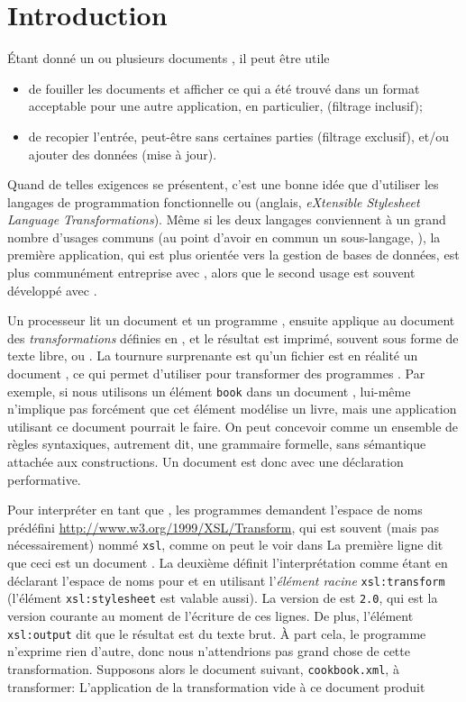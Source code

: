 \section{Introduction}

Étant donné un ou plusieurs documents \XML, il peut être utile
\begin{itemize}

  \item de fouiller les documents et afficher ce qui a été trouvé dans
  un format acceptable pour une autre application, en
  particulier, \XML (filtrage inclusif);

  \item de recopier l'entrée, peut-être sans certaines parties
    (filtrage exclusif), et/ou ajouter des données (mise à jour).

\end{itemize}
Quand de telles exigences se présentent, c'est une bonne idée que
d'utiliser les langages de programmation fonctionnelle \XQuery ou
\XSLT (anglais, \emph{eXtensible Stylesheet Language
  Transformations}). Même si les deux langages conviennent à un grand
nombre d'usages communs (au point d'avoir en commun un sous-langage,
\XPath), la première application, qui est plus orientée vers la
gestion de bases de données, est plus communément entreprise avec
\XQuery, alors que le second usage est souvent développé avec \XSLT.

Un processeur \XSLT lit un document \XML et un programme \XSLT,
ensuite applique au document des \emph{transformations} définies en
\XSLT, et le résultat est imprimé, souvent sous forme de texte libre,
\XML ou \HTML. La tournure surprenante est qu'un fichier \XSLT est en
réalité un document \XML, ce qui permet d'utiliser \XSLT pour
transformer des programmes \XSLT. Par exemple, si nous utilisons un
élément \verb|book| dans un document \XML, \XML lui-même n'implique
pas forcément que cet élément modélise un livre, mais une application
utilisant ce document pourrait le faire. On peut concevoir \XML comme
un ensemble de règles syntaxiques, autrement dit, une grammaire
formelle, sans sémantique attachée aux constructions. Un document
\XSLT est donc \XML avec une déclaration performative.

Pour interpréter \XML en tant que \XSLT, les programmes demandent
l'espace de noms prédéfini
{\small\url{http://www.w3.org/1999/XSL/Transform}}, qui est souvent
(mais pas nécessairement) nommé \texttt{xsl}, comme on peut le voir
dans  La première ligne dit que ceci
est un document \XML. La deuxième définit l'interprétation comme étant
\XSLT en déclarant l'espace de noms pour \XSLT et en utilisant
l'\emph{élément racine} \texttt{xsl:transform} (l'élément
\texttt{xsl:stylesheet} est valable aussi). La version de \XSLT est
\texttt{2.0}, qui est la version courante au moment de l'écriture de
ces lignes. De plus, l'élément \texttt{xsl:output} dit que le résultat
est du texte brut. À part cela, le programme n'exprime rien d'autre,
donc nous n'attendrions pas grand chose de cette
transformation. Supposons alors le document \XML suivant,
\texttt{cookbook.xml}, à transformer:
\noindent L'application de la transformation vide à ce document
produit

